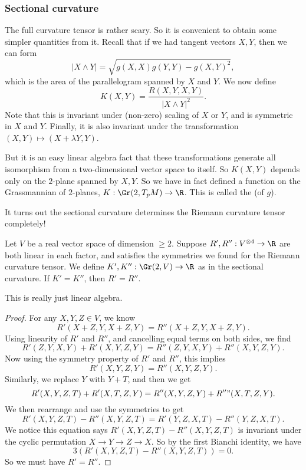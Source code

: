 \documentclass[a4paper]{article}
\begin{document}
\subsubsection*{Sectional curvature}
The full curvature tensor is rather scary. So it is convenient to obtain some simpler quantities from it. Recall that if we had tangent vectors $X, Y$, then we can form
\[
  |X \wedge Y| = \sqrt{g(X, X)g(Y, Y) - g(X, Y)^2},
\]
which is the area of the parallelogram spanned by $X$ and $Y$. We now define
\[
  K(X, Y) = \frac{R(X, Y, X, Y)}{|X \wedge Y|^2}.
\]
Note that this is invariant under (non-zero) scaling of $X$ or $Y$, and is symmetric in $X$ and $Y$. Finally, it is also invariant under the transformation $(X, Y) \mapsto (X + \lambda Y, Y)$.

But it is an easy linear algebra fact that these transformations generate all isomorphism from a two-dimensional vector space to itself. So $K(X, Y)$ depends only on the $2$-plane spanned by $X, Y$. So we have in fact defined a function on the Grassmannian of $2$-planes, $K: \Gr(2, T_p M) \to \R$. This is called the  (of $g$).

It turns out the sectional curvature determines the Riemann curvature tensor completely!
\begin{lemma}
  Let $V$ be a real vector space of dimension $\geq 2$. Suppose $R', R'': V^{\otimes 4} \to \R$ are both linear in each factor, and satisfies the symmetries we found for the Riemann curvature tensor. We define $K', K'': \Gr(2, V) \to \R$ as in the sectional curvature. If $K' = K''$, then $R' = R''$.
\end{lemma}
This is really just linear algebra.
\begin{proof}
  For any $X, Y, Z \in V$, we know
  \[
    R'(X + Z, Y, X + Z, Y) = R''(X + Z, Y, X + Z, Y).
  \]
  Using linearity of $R'$ and $R''$, and cancelling equal terms on both sides, we find
  \[
    R'(Z, Y, X, Y) + R'(X, Y, Z, Y) = R''(Z, Y, X, Y) + R''(X, Y, Z, Y).
  \]
  Now using the symmetry property of $R'$ and $R''$, this implies
  \[
    R'(X, Y, Z, Y) = R''(X, Y, Z, Y).
  \]
  Similarly, we replace $Y$ with $Y + T$, and then we get
  \[
    R'(X, Y, Z, T) + R'(X, T, Z, Y) = R''(X, Y, Z, Y) + R''"(X, T, Z, Y).
  \]
  We then rearrange and use the symmetries to get
  \[
    R'(X, Y, Z, T) - R''(X, Y, Z, T) = R'(Y, Z, X, T) - R''(Y, Z, X, T).
  \]
  We notice this equation says $R'(X, Y, Z, T) - R''(X, Y, Z, T)$ is invariant under the cyclic permutation $X \to Y \to Z \to X$. So by the first Bianchi identity, we have
  \[
    3(R'(X, Y, Z, T) - R''(X, Y, Z, T)) = 0.
  \]
  So we must have $R' = R''$.
\end{proof}
\end{document}
